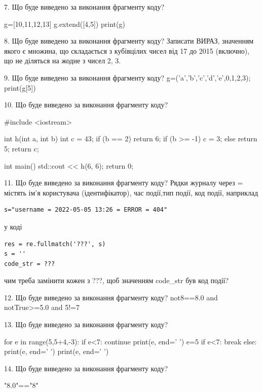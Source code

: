 \documentclass[11pt]{article}
\begin{document}

7. Що буде виведено за виконання фрагменту коду?

g=[10,11,12,13]
g.extend([4,5])
print(g)



8. Що буде виведено за виконання фрагменту коду?
Записати ВИРАЗ, значенням якого є множина, що складається з кубівцілих чисел від 17 до 2015 (включно), що не діляться на жодне з чисел 2, 3.

9. Що буде виведено за виконання фрагменту коду?
g=('a','b','c','d','e',0,1,2,3); print(g[5])

10. Що буде виведено за виконання фрагменту коду?

#include <iostream>

int h(int a, int b){
    int c = 43;
    if (b == 2)
        return 6;
    if (b >= -1)
         c = 3;
    else 
        return 5;
    return c;
}

int main(){
    std::cout << h(6, 6);
    return 0;
}


11. Що буде виведено за виконання фрагменту коду?
Рядки журналу через = містять ім'я користувача (ідентифікатор), час події,тип події, код події, наприклад
\begin{verbatim}
s="username = 2022-05-05 13:26 = ERROR = 404"
\end{verbatim}
у коді 
\begin{verbatim}
res = re.fullmatch('???', s) 
s = ''
code_str = ??? 
\end{verbatim}
чим треба замінити кожен з ???, щоб значенням code\_str був код події? 




12. Що буде виведено за виконання фрагменту коду?
not8==8.0 and notTrue>=5.0 and 5!=7

13. Що буде виведено за виконання фрагменту коду?

for e in range(5,5+4,-3):
    if e<7:
        continue
    print(e, end=' ')
    e=5
    if e<7:
        break
else:
    print(e, end=' ')
print(e, end=' ')


14. Що буде виведено за виконання фрагменту коду?

"8.0"=="8"

\end{document}
